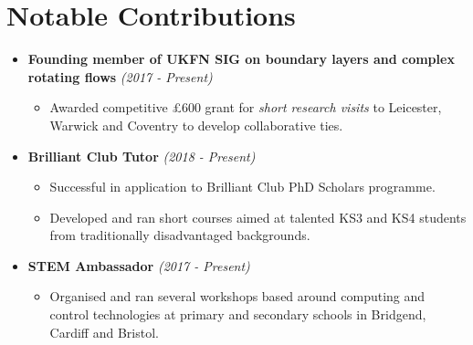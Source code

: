\documentclass[10pt,a4paper,sans]{moderncv}        %
\begin{document}
	
	\section{Notable Contributions}
	
	\vspace{5pt}
	
	\begin{itemize}
		
		\item{\textbf{Founding member of UKFN SIG on boundary layers and complex rotating flows} \hfill \textit{(2017 - Present)}
			
			\vspace{4pt}
			
			\small{
				\begin{itemize}	
					\item Awarded competitive £600 grant for \textit{short research visits} to Leicester, Warwick and Coventry to develop collaborative ties. 
				\end{itemize}
				
		}}
		
		\vspace{4pt}
		
		\item{ \textbf{Brilliant Club Tutor} \hfill\textit{(2018 - Present)}
			
			\vspace{4pt}
			
			\small{
				\begin{itemize}	
					\item Successful in application to Brilliant Club PhD Scholars programme.
					\vspace{3pt} 
					\item Developed and ran short courses aimed at talented KS3 and KS4 students from traditionally disadvantaged backgrounds.
				\end{itemize}
		} }
		
		\vspace{4pt}
		
		\item{ \textbf{STEM Ambassador} \hfill\textit{(2017 - Present)} 
			
			\vspace{4pt}
			
			\small{
				\begin{itemize}	
					\item Organised and ran several workshops based around computing and control technologies at primary and secondary schools in Bridgend, Cardiff and Bristol.
				\end{itemize}
		} }
		

\end{itemize}
\end{document}
